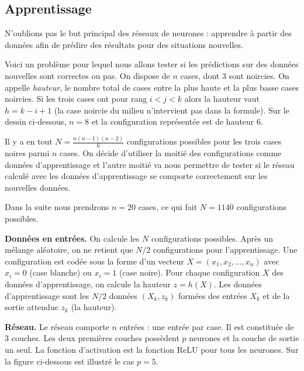 \documentclass[11pt,class=report,crop=false]{standalone}
\begin{document}
 
\subsection{Apprentissage}

N'oublions pas le but principal des réseaux de neurones : apprendre à partir des données afin de prédire des résultats pour des situations nouvelles.


Voici un problème pour lequel nous allons tester si les prédictions sur des données nouvelles sont correctes ou pas.
On dispose de $n$ cases, dont $3$ sont noircies.  On appelle \emph{hauteur}, le nombre total de cases entre la plus haute et la plus basse cases noircies. Si les trois cases ont pour rang $i < j <k$ alors la hauteur vaut $h = k-i+1$ (la case noircie du milieu n'intervient pas dans la formule).
Sur le dessin ci-dessous, $n=8$ et la configuration représentée est de hauteur $6$.


Il y a en tout $N = \frac{n(n-1)(n-2)}{6}$ configurations possibles pour les trois cases noires parmi $n$ cases.
On décide d'utiliser la moitié des configurations comme données d'apprentissage et l'autre moitié va nous permettre de tester si le réseau calculé avec les données d'apprentissage se comporte \og{} correctement\fg{} sur les nouvelles données.

Dans la suite nous prendrons $n=20$ cases, ce qui fait $N=1140$ configurations possibles.

\textbf{Données en entrées.}
On calcule les $N$ configurations possibles. Après un mélange aléatoire, on ne retient que $N/2$ configurations pour l'apprentissage. Une configuration est codée sous la forme d'un vecteur
$X = (x_1,x_2,\ldots,x_n)$ avec $x_i=0$ (case blanche) ou $x_i = 1$ (case noire).
Pour chaque configuration $X$ des données d'apprentissage, on calcule la hauteur $z = h(X)$. Les données d'apprentissage sont les $N/2$ données $(X_k,z_k)$ formées des entrées $X_k$ et de la sortie attendue $z_k$ (la hauteur). 

\textbf{Réseau.}
Le réseau comporte $n$ entrées : une entrée par case. Il est constituée de $3$ couches.
Les deux premières couches possèdent $p$ neurones et la couche de sortie un seul. La fonction d'activation est la fonction ReLU pour tous les neurones. Sur la figure ci-dessous est illustré le cas $p=5$.

\end{document}
